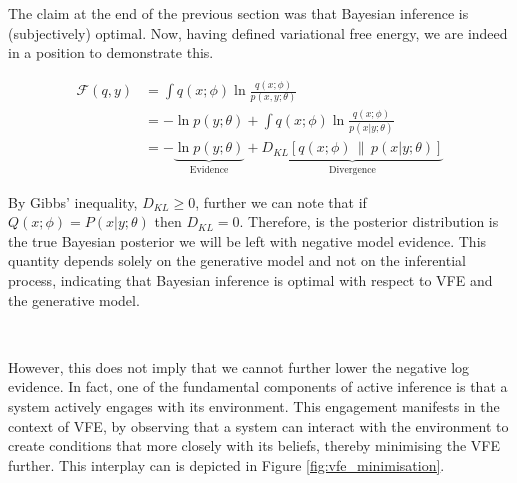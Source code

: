 \documentclass{article}
\begin{document}
The claim at the end of the previous section was that Bayesian inference is (subjectively) optimal. Now, having defined variational free energy, we are indeed in a position to demonstrate this.

\begin{equation}\label{eq:vfe_low_road}
	\begin{aligned}
		\mathcal{F}(q, y) &=  \int q(x; \phi) \ln \frac{q(x; \phi)}{p(x, y; \theta)} \\
		&= - \ln p(y; \theta) + \int q(x; \phi) \ln \frac{q(x; \phi)}{p(x | y; \theta)} \\ 
		&= - \underbrace{\ln p(y; \theta)}_{\text{Evidence}} + \underbrace{D_{KL}\left[ q(x; \phi) \,\|\, p(x | y; \theta) \right]}_{\text{Divergence}}
	\end{aligned}
\end{equation}

By Gibbs' inequality, $D_{KL} \geq 0 $, further we can note that if $Q(x; \phi) = P(x | y; \theta)$ then $D_{KL} = 0$. Therefore, is the posterior distribution is the true Bayesian posterior we will be left with negative model evidence. This quantity depends solely on the generative model and not on the inferential process, indicating that Bayesian inference is optimal with respect to VFE and the generative model.

\

However, this does not imply that we cannot further lower the negative log evidence. In fact, one of the fundamental components of active inference is that a system actively engages with its environment. This engagement manifests in the context of VFE, by observing that a system can interact with the environment to create conditions that more closely with its beliefs, thereby minimising the VFE further. This interplay can is depicted in Figure \ref{fig:vfe_minimisation}. 
\end{document}
